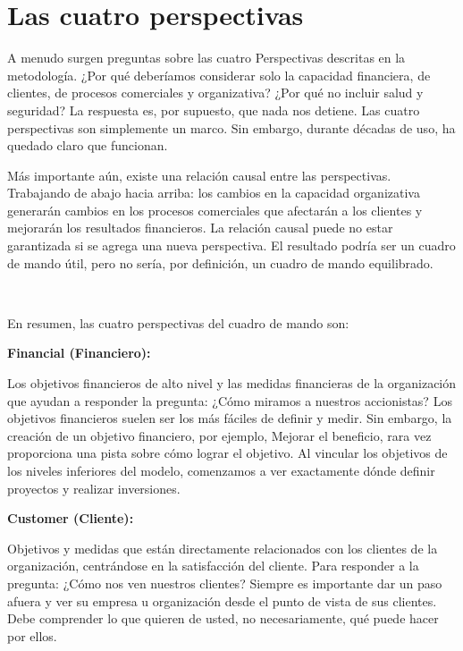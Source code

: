 \section*{Las cuatro perspectivas}
\item{A menudo surgen preguntas sobre las cuatro Perspectivas descritas en la metodología. ¿Por qué deberíamos considerar solo la capacidad financiera, de clientes, de procesos comerciales y organizativa? ¿Por qué no incluir salud y seguridad? La respuesta es, por supuesto, que nada nos detiene. Las cuatro perspectivas son simplemente un marco. Sin embargo, durante décadas de uso, ha quedado claro que funcionan.

Más importante aún, existe una relación causal entre las perspectivas. Trabajando de abajo hacia arriba: los cambios en la capacidad organizativa generarán cambios en los procesos comerciales que afectarán a los clientes y mejorarán los resultados financieros. La relación causal puede no estar garantizada si se agrega una nueva perspectiva. El resultado podría ser un cuadro de mando útil, pero no sería, por definición, un cuadro de mando equilibrado.}
\\
\item{En resumen, las cuatro perspectivas del cuadro de mando son:}
\textbf{}
\\
\item \textbf{Financial (Financiero):}
\item{Los objetivos financieros de alto nivel y las medidas financieras de la organización que ayudan a responder la pregunta: ¿Cómo miramos a nuestros accionistas? Los objetivos financieros suelen ser los más fáciles de definir y medir. Sin embargo, la creación de un objetivo financiero, por ejemplo, Mejorar el beneficio, rara vez proporciona una pista sobre cómo lograr el objetivo. Al vincular los objetivos de los niveles inferiores del modelo, comenzamos a ver exactamente dónde definir proyectos y realizar inversiones.}
\textbf{}
\\
\item \textbf{Customer (Cliente):}
\item{Objetivos y medidas que están directamente relacionados con los clientes de la organización, centrándose en la satisfacción del cliente. Para responder a la pregunta: ¿Cómo nos ven nuestros clientes? Siempre es importante dar un paso afuera y ver su empresa u organización desde el punto de vista de sus clientes. Debe comprender lo que quieren de usted, no necesariamente, qué puede hacer por ellos.}
\textbf{}
\\
